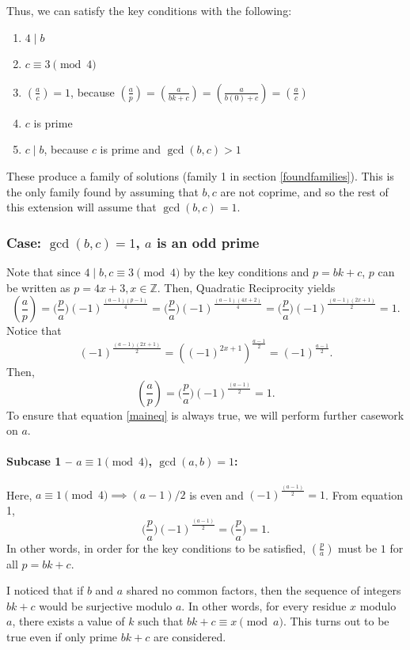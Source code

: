 \documentclass{article}
\newcommand{\Z}{\mathbb{Z}}
\newcommand{\qrbg}[2]{\bigg( \frac{#1}{#2}\bigg)}
\newcommand{\qrn}[2]{\left( \frac{#1}{#2}\right)}
\begin{document}
Thus, we can satisfy the key conditions with the following:
\begin{enumerate}
    \item $4\mid b$
    \item $c \equiv 3\pmod 4$
    \item $\qrn{a}{c}=1$, because $\qrn{a}{p}=\qrn{a}{bk+c}=\qrn{a}{b(0)+c}=\qrn{a}{c}$
    \item $c$ is prime
    \item $c\mid b$, because $c$ is prime and $\gcd(b,c)>1$
\end{enumerate}
These produce a family of solutions (family 1 in section \ref{foundfamilies}). This is the only family found by assuming that $b,c$ are not coprime, and so the rest of this extension will assume that $\gcd(b,c) = 1$.

\subsubsection{Case: $\gcd(b,c)=1$, $a$ is an odd prime}
Note that since $4\mid b, c \equiv 3 \pmod 4$ by the key conditions and $p = bk + c$, $p$ can be written as $p=4x+3, x \in \Z$. Then, Quadratic Reciprocity yields \[\qrn{a}{p} = \qrbg{p}{a}(-1)^{\frac{(a-1)(p-1)}{4}} = \qrbg{p}{a} (-1)^{\frac{(a-1)(4x+2)}{4}} = \qrbg{p}{a} (-1)^{\frac{(a-1)(2x+1)}{2}} = 1.\]
Notice that \[(-1)^{\frac{(a-1)(2x+1)}{2}}=((-1)^{2x+1})^\frac{a-1}{2} = (-1)^{\frac{a-1}{2}}.\]
Then,
\begin{equation}
\label{maineq}
\qrn{a}{p} = \qrbg{p}{a} (-1)^{\frac{(a-1)}{2}} = 1.
\end{equation}
To ensure that equation \ref{maineq} is always true, we will perform further casework on $a$.

\paragraph{Subcase 1 -- $a \equiv 1 \pmod 4$, $\gcd(a,b)=1$:} Here, $a\equiv 1\pmod 4 \implies (a-1)/2$ is even and $(-1)^{\frac{(a-1)}{2}}=1$. From equation 1, \[\qrbg{p}{a} (-1)^{\frac{(a-1)}{2}} = \qrbg{p}{a}=1.\] In other words, in order for the key conditions to be satisfied, $\qrn{p}{a}$ must be $1$ for all $p=bk+c$. 

I noticed that if $b$ and $a$ shared no common factors, then the sequence of integers $bk+c$ would be surjective modulo $a$. In other words, for every residue $x$ modulo $a$, there exists a value of $k$ such that $bk+c \equiv x \pmod a$. This turns out to be true even if only prime $bk+c$ are considered.
\end{document}
